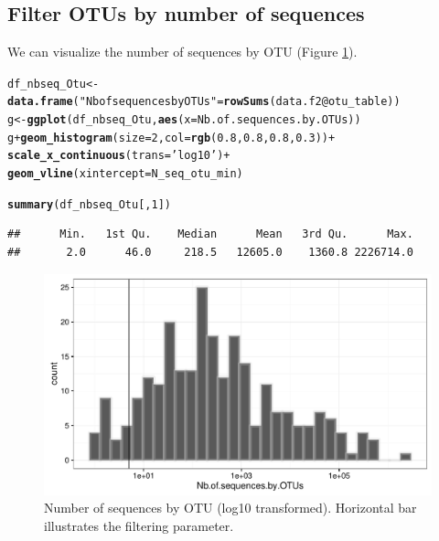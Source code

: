 \documentclass[12pt]{article}\usepackage[]{graphicx}\usepackage[]{color}
\makeatletter
\def\maxwidth{ %
  \ifdim\Gin@nat@width>\linewidth
    \linewidth
  \else
    \Gin@nat@width
  \fi
}
\newcommand{\hlnum}[1]{\textcolor[rgb]{0.686,0.059,0.569}{#1}}%
\newcommand{\hlstr}[1]{\textcolor[rgb]{0.192,0.494,0.8}{#1}}%
\newcommand{\hlopt}[1]{\textcolor[rgb]{0,0,0}{#1}}%
\newcommand{\hlstd}[1]{\textcolor[rgb]{0.345,0.345,0.345}{#1}}%
\newcommand{\hlkwb}[1]{\textcolor[rgb]{0.69,0.353,0.396}{#1}}%
\newcommand{\hlkwc}[1]{\textcolor[rgb]{0.333,0.667,0.333}{#1}}%
\newcommand{\hlkwd}[1]{\textcolor[rgb]{0.737,0.353,0.396}{\textbf{#1}}}%
\newenvironment{kframe}{%
 \def\at@end@of@kframe{}%
 \ifinner\ifhmode%
  \def\at@end@of@kframe{\end{minipage}}%
  \begin{minipage}{\columnwidth}%
 \fi\fi%
 \def\FrameCommand##1{\hskip\@totalleftmargin \hskip-\fboxsep
 \colorbox{shadecolor}{##1}\hskip-\fboxsep
     \hskip-\linewidth \hskip-\@totalleftmargin \hskip\columnwidth}%
 \MakeFramed {\advance\hsize-\width
   \@totalleftmargin\z@ \linewidth\hsize
   \@setminipage}}%
 {\par\unskip\endMakeFramed%
 \at@end@of@kframe}
\newenvironment{knitrout}{}{} %
\numberwithin{figure}{section}
\makeatother
\begin{document}
 \subsection{Filter OTUs by number of sequences}

 We can visualize the number of sequences by OTU (Figure \ref{fig:nbseq_Otu}).

\begin{knitrout}\small
{}\color{fgcolor}\begin{kframe}
\begin{alltt}
\hlstd{df_nbseq_Otu} \hlkwb{<-} \hlkwd{data.frame}\hlstd{(}\hlstr{"Nb of sequences by OTUs"} \hlstd{=} \hlkwd{rowSums}\hlstd{(data.f2}\hlopt{@}\hlkwc{otu_table}\hlstd{))}
\hlstd{g} \hlkwb{<-} \hlkwd{ggplot}\hlstd{(df_nbseq_Otu,} \hlkwd{aes}\hlstd{(}\hlkwc{x} \hlstd{= Nb.of.sequences.by.OTUs))}
\hlstd{g} \hlopt{+} \hlkwd{geom_histogram}\hlstd{(}\hlkwc{size} \hlstd{=} \hlnum{2}\hlstd{,} \hlkwc{col} \hlstd{=} \hlkwd{rgb}\hlstd{(}\hlnum{0.8}\hlstd{,} \hlnum{0.8}\hlstd{,} \hlnum{0.8}\hlstd{,} \hlnum{0.3}\hlstd{))} \hlopt{+}
  \hlkwd{scale_x_continuous}\hlstd{(}\hlkwc{trans} \hlstd{=} \hlstr{'log10'}\hlstd{)} \hlopt{+}
  \hlkwd{geom_vline}\hlstd{(}\hlkwc{xintercept}\hlstd{= N_seq_otu_min)}
\end{alltt}


{\ttfamily\noindent\itshape\color{messagecolor}{\#\# `stat\_bin()` using `bins = 30`. Pick better value with `binwidth`.}}\begin{alltt}
\hlkwd{summary}\hlstd{(df_nbseq_Otu[,} \hlnum{1}\hlstd{])}
\end{alltt}
\begin{verbatim}
##      Min.   1st Qu.    Median      Mean   3rd Qu.      Max. 
##       2.0      46.0     218.5   12605.0    1360.8 2226714.0
\end{verbatim}
\end{kframe}\begin{figure}

{\centering \includegraphics[width=\maxwidth]{figure/nbseq_Otu-1} 

}

\caption[Number of sequences by OTU (log10 transformed)]{Number of sequences by OTU (log10 transformed). Horizontal bar illustrates the filtering parameter.}\label{fig:nbseq_Otu}
\end{figure}


\end{knitrout}
\end{document}
